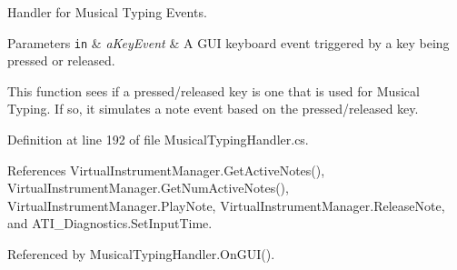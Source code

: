 Handler for Musical Typing Events. 


\begin{DoxyParams}[1]{Parameters}
\mbox{\tt in}  & {\em a\+Key\+Event} & A G\+UI keyboard event triggered by a key being pressed or released.\\
\hline
\end{DoxyParams}
This function sees if a pressed/released key is one that is used for Musical Typing. If so, it simulates a note event based on the pressed/released key. 

Definition at line 192 of file Musical\+Typing\+Handler.\+cs.



References Virtual\+Instrument\+Manager.\+Get\+Active\+Notes(), Virtual\+Instrument\+Manager.\+Get\+Num\+Active\+Notes(), Virtual\+Instrument\+Manager.\+Play\+Note, Virtual\+Instrument\+Manager.\+Release\+Note, and A\+T\+I\+\_\+\+Diagnostics.\+Set\+Input\+Time.



Referenced by Musical\+Typing\+Handler.\+On\+G\+U\+I().


